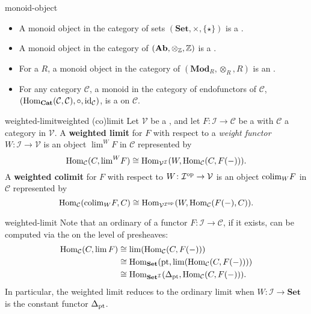 \begin{example}{monoid-object}
    \begin{itemize}
        \item A monoid object in the category of sets $(\textbf{Set}, \times, \{ \star \})$ is a .
        \item A monoid object in the category of  $(\textbf{Ab}, \otimes_{\mathbb{Z}}, \mathbb{Z})$ is a .
        \item For a  $R$, a monoid object in the category of  $(\textbf{Mod}_R, \otimes_R, R)$ is an .
        \item For any category $\mathcal{C}$, a monoid in the category of endofunctors of $\mathcal{C}$, $(\operatorname{Hom}_\textbf{Cat}(\mathcal{C}, \mathcal{C}), \circ, \textup{id}_\mathcal{C})$, is a  on $\mathcal{C}$.
    \end{itemize}
\end{example}

\begin{topic}{weighted-limit}{weighted (co)limit}
    Let $\mathcal{V}$ be a , and let $F \colon \mathcal{I} \to \mathcal{C}$ be a  with $\mathcal{C}$ a category  in $\mathcal{V}$. A \textbf{weighted limit} for $F$ with respect to a \textit{weight functor} $W \colon \mathcal{I} \to \mathcal{V}$ is an object ${\lim}^W F$ in $\mathcal{C}$ represented by
    \[ \operatorname{Hom}_\mathcal{C}(C, {\lim}^W F) \cong \operatorname{Hom}_{\mathcal{V}^\mathcal{I}}(W, \operatorname{Hom}_\mathcal{C}(C, F(-))) . \]
    A \textbf{weighted colimit} for $F$ with respect to $W \colon \mathcal{I}^\textup{op} \to \mathcal{V}$ is an object ${\operatorname*{colim}}_W F$ in $\mathcal{C}$ represented by
    \[ \operatorname{Hom}_\mathcal{C}({\operatorname*{colim}}_W F, C) \cong \operatorname{Hom}_{\mathcal{V}^{\mathcal{I}^\textup{op}}}(W, \operatorname{Hom}_\mathcal{C}(F(-), C)) . \]
\end{topic}

\begin{example}{weighted-limit}
    Note that an ordinary  of a functor $F \colon \mathcal{I} \to \mathcal{C}$, if it exists, can be computed via the  on the level of presheaves:
    \[ \begin{aligned} \operatorname{Hom}_\mathcal{C}(C, \lim F) &\cong \lim (\operatorname{Hom}_\mathcal{C}(C, F(-))) \\ &\cong \operatorname{Hom}_\textbf{Set}(\textup{pt}, \lim (\operatorname{Hom}_\mathcal{C}(C, F(-)))) \\ &\cong \operatorname{Hom}_{\textbf{Set}^\mathcal{I}}(\Delta_{\textup{pt}}, \operatorname{Hom}_\mathcal{C}(C, F(-))) . \end{aligned} \]
    In particular, the weighted limit reduces to the ordinary limit when $W \colon \mathcal{I} \to \textbf{Set}$ is the constant functor $\Delta_\textup{pt}$.
\end{example}

